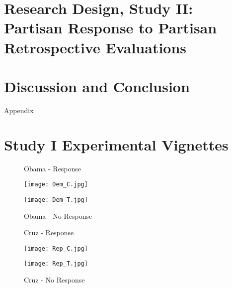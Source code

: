 \documentclass[12pt, letterpaper]{article}
\begin{document}
\section*{Research Design, Study II: Partisan Response to Partisan Retrospective Evaluations}



\section*{Discussion and Conclusion}

\clearpage




\clearpage

\appendix
\renewcommand{\thesection}{A \arabic{section}}
\renewcommand\thetable{\thesection.\arabic{table}}  
\renewcommand\thefigure{\thesection.\arabic{figure}}

\begin{center}
\Large{Appendix}
\end{center}

\section{Study I Experimental Vignettes}

\begin{figure}[ht]
\centering
\begin{minipage}[b][12cm][b]{0.45\linewidth}
\caption{Obama - Response}
\texttt{[image: Dem\_C.jpg]}
\label{fig:minipage1}
\end{minipage}
\quad
\begin{minipage}[b]{0.45\linewidth}
\caption{Obama - No Response}
\texttt{[image: Dem\_T.jpg]}
\label{fig:minipage2}
\end{minipage}
\end{figure}

\begin{figure}[ht]
\centering
\begin{minipage}[b][12cm][b]{0.45\linewidth}
\caption{Cruz - Response}
\texttt{[image: Rep\_C.jpg]}
\label{fig:minipage3}
\end{minipage}
\quad
\begin{minipage}[b]{0.45\linewidth}
\caption{Cruz - No Response}
\texttt{[image: Rep\_T.jpg]}
\label{fig:minipage4}
\end{minipage}
\end{figure}
\end{document}
